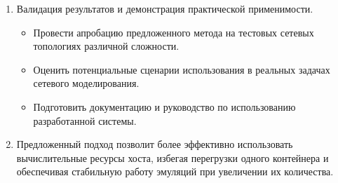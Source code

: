\begin{enumerate}
\begin{itemize}
        \end{itemize}
    \item Валидация результатов и демонстрация практической применимости.
        \begin{itemize}
            \item Провести апробацию предложенного метода на тестовых сетевых топологиях различной сложности.
            \item Оценить потенциальные сценарии использования в реальных задачах сетевого моделирования.
            \item Подготовить документацию и руководство по использованию разработанной системы.
        \end{itemize}
    \item Предложенный подход позволит более эффективно использовать вычислительные ресурсы хоста, избегая перегрузки одного контейнера и обеспечивая стабильную работу эмуляций при увеличении их количества.
\end{enumerate}

